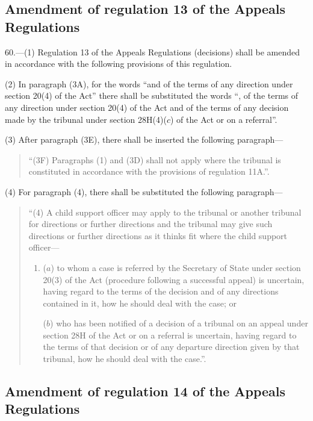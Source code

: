 \documentclass[a4paper]{article}
\begin{document}
\subsection[60. Amendment of regulation 13 of the Appeals Regulations]{Amendment of regulation 13 of the Appeals Regulations}

60.—(1) Regulation 13 of
the Appeals Regulations (decisions) shall be amended in accordance with the
following provisions of this regulation.

(2) In paragraph (3A), for the words “and of the terms of any direction under
section 20(4) of the Act” there shall be substituted the words “, of the terms
of any direction under section 20(4) of the Act and of the terms of any decision
made by the tribunal under section 28H(4)($c$) of the Act or on a referral”.

(3) After paragraph (3E), there shall be inserted the following paragraph—
\begin{quotation}
“(3F) Paragraphs (1) and (3D) shall not apply where the tribunal is constituted
in accordance with the provisions of regulation 11A.”.
\end{quotation}

(4) For paragraph (4), there shall be substituted the following paragraph—
\begin{quotation}
“(4) A child support officer may apply to the tribunal or another tribunal for
directions or further directions and the tribunal may give such directions or
further directions as it thinks fit where the child support officer—
\begin{enumerate}\item[]
($a$) to whom a case is referred by the Secretary of State under section 20(3) of
the Act (procedure following a successful appeal) is uncertain, having regard to
the terms of the decision and of any directions contained in it, how he should
deal with the case; or

($b$) who has been notified of a decision of a tribunal on an appeal under section
28H of the Act or on a referral is uncertain, having regard to the terms of that
decision or of any departure direction given by that tribunal, how he should
deal with the case.”.
\end{enumerate}
\end{quotation}

\subsection[61. Amendment of regulation 14 of the Appeals Regulations]{Amendment of regulation 14 of the Appeals Regulations}
\end{document}
